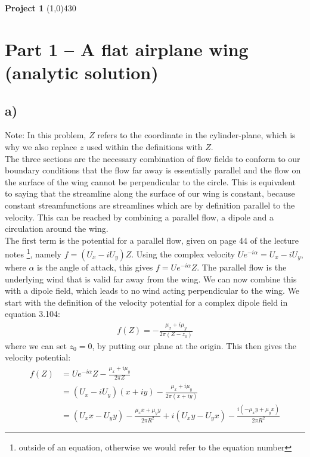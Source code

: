 \documentclass{article}
\newcommand{\AssignmentNum}{1}
\begin{document}
    \begin{center}
    \LARGE{\bfseries{ Project \AssignmentNum}}
    \line(1,0){430}
    \end{center}

\section*{Part 1 -- A flat airplane wing (analytic solution)}

\subsection*{a)}
Note: In this problem, $Z$ refers to the coordinate in the cylinder-plane, which is why we also replace $z$ used within the definitions with $Z$.\\ 
The three sections are the necessary combination of flow fields to conform to our boundary conditions that the flow far away is essentially parallel and the flow on the surface of the wing cannot be perpendicular to the circle. This is equivalent to saying that the streamline along the surface of our wing is constant, because constant streamfunctions are streamlines which are by definition parallel to the velocity. This can be reached by combining a parallel flow, a dipole and a circulation around the wing.\\
The first term is the potential for a parallel flow, given on page 44 of the lecture notes \footnote{outside of an equation, otherwise we would refer to the equation number}, namely $f=(U_x-iU_y)Z$. 
Using the complex velocity $Ue^{-i\alpha} = U_x - i U_y$, where $\alpha$ is the angle of attack, this gives $f=Ue^{-i\alpha}Z$. The parallel flow is the underlying wind that is valid far away from the wing.
We can now combine this with a dipole field, which leads to no wind acting perpendicular to the wing. We start with the definition of the velocity potential for a complex dipole field in equation 3.104:
\begin{align*}
    f(Z)=-\frac{\mu_x+i\mu_y}{2\pi (Z-z_0)}
\end{align*}
where we can set $z_0=0$, by putting our plane at the origin. This then gives the velocity potential: 
\begin{align*}
    f(Z) &= Ue^{-i\alpha}Z - \frac{\mu_x+i\mu_y}{2\pi Z} \\
    &= (U_x - i U_y)(x + iy) - \frac{\mu_x + i\mu_y}{2\pi (x + iy)} \\
    &= (U_xx - U_yy) - \frac{\mu_xx + \mu_yy}{2\pi R^2} + i(U_xy - U_yx) - \frac{i(-\mu_xy + \mu_yx)}{2\pi R^2}
\end{align*}
\end{document}
